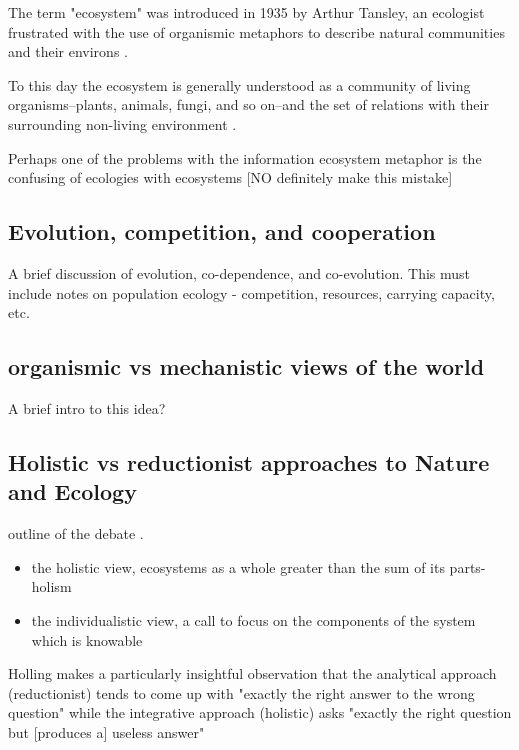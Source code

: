 The term "ecosystem" was introduced in 1935 by Arthur Tansley, an ecologist frustrated with the use of organismic metaphors to describe natural communities and their environs \cite{tansley_1935}. 

To this day the ecosystem is generally understood as a community of living organisms--plants, animals, fungi, and so on--and the set of relations with their surrounding non-living environment \cite{tansley_1935, odum_1953}. 

Perhaps one of the problems with the information ecosystem metaphor is the confusing of ecologies with ecosystems [NO definitely make this mistake]

\subsection{Evolution, competition, and cooperation}

A brief discussion of evolution, co-dependence, and co-evolution. This must include notes on population ecology - competition, resources, carrying capacity, etc.

\subsection{organismic vs mechanistic views of the world}

A brief intro to this idea?

\subsection{Holistic vs reductionist approaches to Nature and Ecology}

outline of the debate \cite{holling_1998, worster_1977}. \begin{itemize} \item the holistic view, ecosystems as a whole greater than the sum of its parts-holism \cite{clements_1936} \item the individualistic view, a call to focus on the components of the system which is knowable \cite{gleason_1939} \end{itemize}

Holling makes a particularly insightful observation that the analytical approach (reductionist) tends to come up with "exactly the right answer to the wrong question" while the integrative approach (holistic) asks "exactly the right question but [produces a] useless answer" \cite[][p. 3]{holling_1998} 

